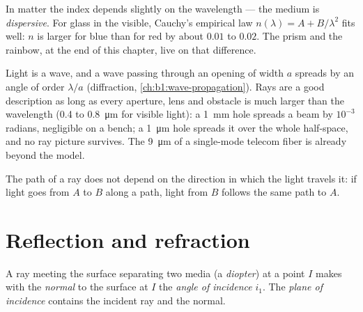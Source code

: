 \begin{remark}[Dispersion]\label{rem:b1:rays-reflection-refraction:dispersion}
In matter the index depends slightly on the wavelength --- the medium is
\emph{dispersive}. For glass in the visible, Cauchy's empirical law
$n(\lambda) = A + B/\lambda^2$ fits well: $n$ is larger for blue than for
red by about $0.01$ to $0.02$. The prism and the rainbow, at the end of
this chapter, live on that difference.
\end{remark}

\begin{remark}\label{rem:b1:rays-reflection-refraction:limits}
Light is a wave, and a wave passing through an opening of width $a$
spreads by an angle of order $\lambda/a$ (diffraction,
\cref{ch:b1:wave-propagation}). Rays are a good description as long as
every aperture, lens and obstacle is much larger than the wavelength
(\qty{0.4}{} to \qty{0.8}{\micro m} for visible light): a \qty{1}{mm}
hole spreads a beam by $10^{-3}$ radians, negligible on a bench; a
\qty{1}{\micro m} hole spreads it over the whole half-space, and no ray
picture survives. The \qty{9}{\micro m}  of a single-mode telecom
fiber is already beyond the model.
\end{remark}

\begin{proposition}\label{prop:b1:rays-reflection-refraction:reversibility}
The path of a ray does not depend on the direction in which the light
travels it: if light goes from $A$ to $B$ along a path, light from $B$
follows the same path to $A$.
\end{proposition}
\admitted

\section{Reflection and refraction}

\begin{definition}[Incidence]\label{def:b1:rays-reflection-refraction:incidence}
A ray meeting the surface separating two media (a \emph{diopter}) at a
point $I$ makes with the \emph{normal} to the surface at $I$ the
\emph{angle of incidence} $i_1$. The \emph{plane of incidence} contains
the incident ray and the normal.
\end{definition}

